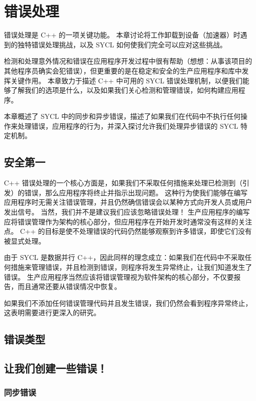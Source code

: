 \section{错误处理}
错误处理是 C++ 的一项关键功能。 本章讨论将工作卸载到设备（加速器）时遇到的独特错误处理挑战，以及 SYCL 如何使我们完全可以应对这些挑战。

检测和处理意外情况和错误在应用程序开发过程中很有帮助（想想：从事该项目的其他程序员确实会犯错误），但更重要的是在稳定和安全的生产应用程序和库中发挥关键作用。 本章致力于描述 C++ 中可用的 SYCL 错误处理机制，以便我们能够了解我们的选项是什么，以及如果我们关心检测和管理错误，如何构建应用程序。

本章概述了 SYCL 中的同步和异步错误，描述了如果我们在代码中不执行任何操作来处理错误，应用程序的行为，并深入探讨允许我们处理异步错误的 SYCL 特定机制。


\subsection{安全第一}
C++ 错误处理的一个核心方面是，如果我们不采取任何措施来处理已检测到（引发）的错误，那么应用程序将终止并指示出现问题。 这种行为使我们能够在编写应用程序时无需关注错误管理，并且仍然确信错误会以某种方式向开发人员或用户发出信号。 当然，我们并不是建议我们应该忽略错误处理！ 生产应用程序的编写应将错误管理作为架构的核心部分，但应用程序在开始开发时通常没有这样的关注点。 C++ 的目标是使不处理错误的代码仍然能够观察到许多错误，即使它们没有被显式处理。

由于 SYCL 是数据并行 C++，因此同样的理念成立：如果我们在代码中不采取任何措施来管理错误，并且检测到错误，则程序将发生异常终止，让我们知道发生了错误。 生产应用程序当然应该将错误管理视为软件架构的核心部分，不仅要报告，而且通常还要从错误情况中恢复。

\begin{remark}
	如果我们不添加任何错误管理代码并且发生错误，我们仍然会看到程序异常终止，这表明需要进行更深入的研究。
\end{remark}

\subsection{错误类型}

\subsection{让我们创建一些错误！}

\subsubsection{同步错误}

